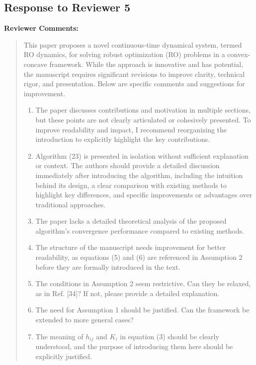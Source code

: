 \documentclass[journal,twoside,web]{ieeecolor}
\begin{document}
\newpage 
\subsection*{Response to Reviewer 5}

\noindent\textbf{Reviewer Comments:}

\begin{quote}
This paper proposes a novel continuous-time dynamical system, termed RO dynamics, for solving robust optimization (RO) problems in a convex-concave framework. While the approach is innovative and has potential, the manuscript requires significant revisions to improve clarity, technical rigor, and presentation. Below are specific comments and suggestions for improvement.

\begin{enumerate}
\item The paper discusses contributions and motivation in multiple sections, but these points are not clearly articulated or cohesively presented. To improve readability and impact, I recommend reorganizing the introduction to explicitly highlight the key contributions.

\item Algorithm (23) is presented in isolation without sufficient explanation or context. The authors should provide a detailed discussion immediately after introducing the algorithm, including the intuition behind its design, a clear comparison with existing methods to highlight key differences, and specific improvements or advantages over traditional approaches.

\item The paper lacks a detailed theoretical analysis of the proposed algorithm's convergence performance compared to existing methods.

\item The structure of the manuscript needs improvement for better readability, as equations (5) and (6) are referenced in Assumption 2 before they are formally introduced in the text.

\item The conditions in Assumption 2 seem restrictive. Can they be relaxed, as in Ref. [34]? If not, please provide a detailed explanation.

\item The need for Assumption 1 should be justified. Can the framework be extended to more general cases?

\item The meaning of $h_{ij}$ and $K_i$ in equation (3) should be clearly understood, and the purpose of introducing them here should be explicitly justified.


\end{enumerate}
\end{quote}
\end{document}
